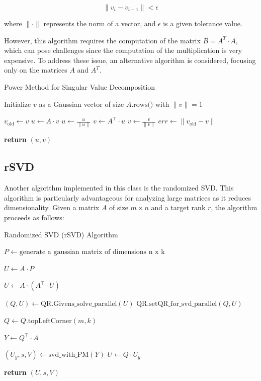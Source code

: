 \documentclass{article}
\begin{document}
\[ \lVert v_i - v_{i-1} \rVert < \epsilon \]

where \(\lVert \cdot \rVert\) represents the norm of a vector, and \(\epsilon\) is a given tolerance value.

\vspace{\baselineskip}
However, this algorithm requires the computation of the matrix \(B = A^T \cdot A\), which can pose challenges since the computation of the multiplication is very expensive. To address these issue, an alternative algorithm is considered, focusing only on the matrices \(A\) and \(A^T\).

\begin{algorithm}
\caption{Power Method for Singular Value Decomposition}
\begin{algorithmic}[1]
    \State Initialize $v$ as a Gaussian vector of size $A.\text{rows()}$ with $\|v\| = 1$

        \State $v_{\text{old}} \gets v$
        \State $u \gets A \cdot v$
        \State $u \gets \frac{u}{\|u\|}$
        \State $v \gets A^\top \cdot u$
        \State $v \gets \frac{v}{\|v\|}$
        \State $err \gets \|v_{\text{old}} - v\|$
    \EndWhile

    \State \textbf{return} $(u, v)$
\EndFunction
\end{algorithmic}
\end{algorithm}



\subsection{rSVD}
   Another algorithm implemented in this class is the randomized SVD. This algorithm is particularly advantageous for analyzing large matrices as it reduces dimensionality. Given a matrix \(A\) of size \(m \times n\) and a target rank \(r\), the algorithm proceeds as follows:

\begin{algorithm}
\caption{Randomized SVD (rSVD) Algorithm}
\begin{algorithmic}[1]
    \State $P \gets \text{generate a gaussian matrix of dimensions n x k}$ 
    
    \State $U \gets A \cdot P$ 

        \State $U \gets A \cdot (A^\top \cdot U)$
    \EndFor

    \State $(Q, U) \gets \text{QR.Givens\_solve\_parallel}(U)$
    \State $\text{QR.setQR\_for\_svd\_parallel}(Q, U)$

    \State $Q \gets Q.\text{topLeftCorner}(m, k)$

    \State $Y \gets Q^\top \cdot A$ 

    \State $(U_y, s, V) \gets \text{svd\_with\_PM}(Y)$
    \State $U \gets Q \cdot U_y$

    \State \textbf{return} $(U, s, V)$
\EndFunction
\end{algorithmic}
\end{algorithm}
\end{document}
